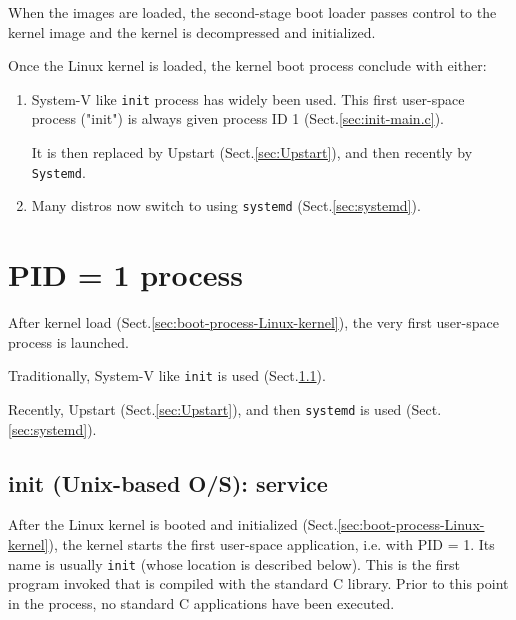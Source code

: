 When the images are loaded, the second-stage boot loader passes control to the
kernel image and the kernel is decompressed and initialized.

Once the Linux kernel is loaded, the kernel boot process conclude with either: 

\begin{enumerate}
  \item  System-V like \verb!init! process has widely been used. This first
  user-space process ("init") is always given process ID 1
  (Sect.\ref{sec:init-main.c}). 

It is then replaced by Upstart (Sect.\ref{sec:Upstart}), and then recently by
\verb!Systemd!.

  \item Many distros now switch to using \verb!systemd!
  (Sect.\ref{sec:systemd}).
  
\end{enumerate}

\section{PID = 1 process}
\label{sec:daemons}
\label{sec:PID=1}

After kernel load (Sect.\ref{sec:boot-process-Linux-kernel}), the very
first user-space process is launched. 

Traditionally, System-V like \verb!init! is used (Sect.\ref{sec:init}).

Recently, Upstart (Sect.\ref{sec:Upstart}), and then \verb!systemd! is used
(Sect.\ref{sec:systemd}).

% 
% 


\subsection{init (Unix-based O/S): service}
\label{sec:init}

After the Linux kernel is booted and initialized
(Sect.\ref{sec:boot-process-Linux-kernel}), the kernel starts the first
user-space application, i.e. with PID = 1. Its name is usually \verb!init!
(whose location is described below). This is the first program invoked that is
compiled with the standard C library. Prior to this point in the process, no
standard C applications have been executed.

